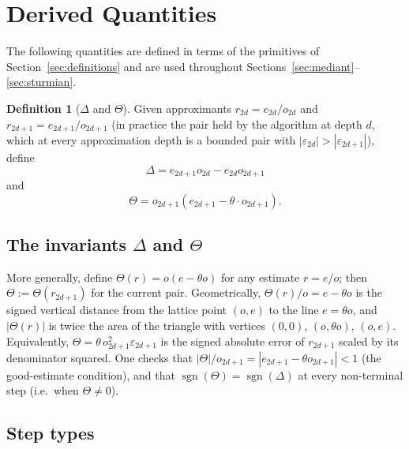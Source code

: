 \documentclass[12pt]{article}
\theoremstyle{definition}
\newtheorem{definition}[theorem]{Definition}
\theoremstyle{remark}
\theoremstyle{plain}
\newcommand{\eps}{\varepsilon}
\newcommand{\Kval}{\Theta}
\newcommand{\Dval}{\Delta}
\begin{document}
\section{Derived Quantities}
\label{sec:derived-quantities}

The following quantities are defined in terms of the primitives of
Section~\ref{sec:definitions} and are used throughout
Sections~\ref{sec:mediant}--\ref{sec:sturmian}.

\begin{definition}[$\Delta$ and $\Theta$]
\label{def:delta-K}
Given approximants $r_{2d} = e_{2d}/o_{2d}$ and $r_{2d+1} = e_{2d+1}/o_{2d+1}$ (in
practice the pair held by the algorithm at depth $d$, which at every approximation depth is a
bounded pair with $|\eps_{2d}| > |\eps_{2d+1}|$), define
\[
  \Dval = e_{2d+1} o_{2d} - e_{2d} o_{2d+1}
\]
and
\[
  \Kval = o_{2d+1}(e_{2d+1} - \theta \cdot o_{2d+1}).
\]
\end{definition}

\subsection*{The invariants $\Delta$ and $\Theta$}

More generally, define $\Kval(r) = o(e - \theta o)$ for any estimate $r = e/o$;
then $\Kval := \Kval(r_{2d+1})$ for the current pair.
Geometrically, $\Kval(r)/o = e - \theta o$ is the signed vertical distance from
the lattice point $(o, e)$ to the line $e = \theta o$, and $|\Kval(r)|$ is twice
the area of the triangle with vertices $(0,0)$, $(o, \theta o)$, $(o, e)$.
Equivalently, $\Kval = \theta\, o_{2d+1}^2 \eps_{2d+1}$ is the signed absolute
error of $r_{2d+1}$ scaled by its denominator squared.
One checks that $|\Kval|/o_{2d+1} = |e_{2d+1} - \theta o_{2d+1}| < 1$ (the good-estimate
condition), and that $\operatorname{sgn}(\Kval) = \operatorname{sgn}(\Dval)$ at every non-terminal
step (i.e.\ when $\Kval \neq 0$).

\subsection*{Step types}
\label{def:step-type}
\end{document}
